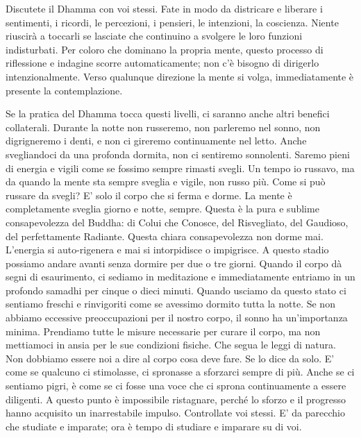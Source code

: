 Discutete il Dhamma con voi stessi. Fate in modo da districare e
liberare i sentimenti, i ricordi, le percezioni, i pensieri, le
intenzioni, la coscienza. Niente riuscirà a toccarli se lasciate che
continuino a svolgere le loro funzioni indisturbati. Per coloro che
dominano la propria mente, questo processo di riflessione e indagine
scorre automaticamente; non c'è bisogno di dirigerlo intenzionalmente.
Verso qualunque direzione la mente si volga, immediatamente è presente
la contemplazione.

Se la pratica del Dhamma tocca questi livelli, ci saranno anche altri
benefici collaterali. Durante la notte non russeremo, non parleremo nel
sonno, non digrigneremo i denti, e non ci gireremo continuamente nel
letto. Anche svegliandoci da una profonda dormita, non ci sentiremo
sonnolenti. Saremo pieni di energia e vigili come se fossimo sempre
rimasti svegli. Un tempo io russavo, ma da quando la mente sta sempre
sveglia e vigile, non russo più. Come si può russare da svegli? E' solo
il corpo che si ferma e dorme. La mente è completamente sveglia giorno e
notte, sempre. Questa è la pura e sublime consapevolezza del Buddha: di
Colui che Conosce, del Risvegliato, del Gaudioso, del perfettamente
Radiante. Questa chiara consapevolezza non dorme mai. L'energia si
auto-rigenera e mai si intorpidisce o impigrisce. A questo stadio
possiamo andare avanti senza dormire per due o tre giorni. Quando il
corpo dà segni di esaurimento, ci sediamo in meditazione e
immediatamente entriamo in un profondo samadhi per cinque o dieci
minuti. Quando usciamo da questo stato ci sentiamo freschi e rinvigoriti
come se avessimo dormito tutta la notte. Se non abbiamo eccessive
preoccupazioni per il nostro corpo, il sonno ha un'importanza minima.
Prendiamo tutte le misure necessarie per curare il corpo, ma non
mettiamoci in ansia per le sue condizioni fisiche. Che segua le leggi di
natura. Non dobbiamo essere noi a dire al corpo cosa deve fare. Se lo
dice da solo. E' come se qualcuno ci stimolasse, ci spronasse a
sforzarci sempre di più. Anche se ci sentiamo pigri, è come se ci fosse
una voce che ci sprona continuamente a essere diligenti. A questo punto
è impossibile ristagnare, perché lo sforzo e il progresso hanno
acquisito un inarrestabile impulso. Controllate voi stessi. E' da
parecchio che studiate e imparate; ora è tempo di studiare e imparare su
di voi.

